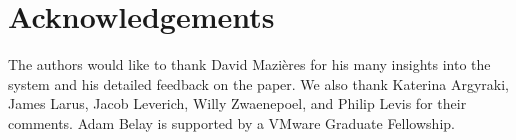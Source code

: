
\section*{Acknowledgements}

The authors would like to thank David Mazi{\`e}res for his many
insights into the system and his detailed feedback on the
paper. We also thank Katerina Argyraki, James Larus, Jacob Leverich, Willy
Zwaenepoel, and Philip Levis for their comments. Adam Belay is supported
by a VMware Graduate Fellowship.

\begin{comment}
\begin{itemize}
\item David Mazieres
\item Carlos Perez (EPFL) last minute IT setup
\item Detailed comments: Jacob Leverich, Jim Larus
\item High-level comments: Katerina Argyraki, Willy Z, Phil Levis
\item Sheperd
\item VMware Graduate Fellowship (for Adam)
\end{itemize}
\end{comment}


